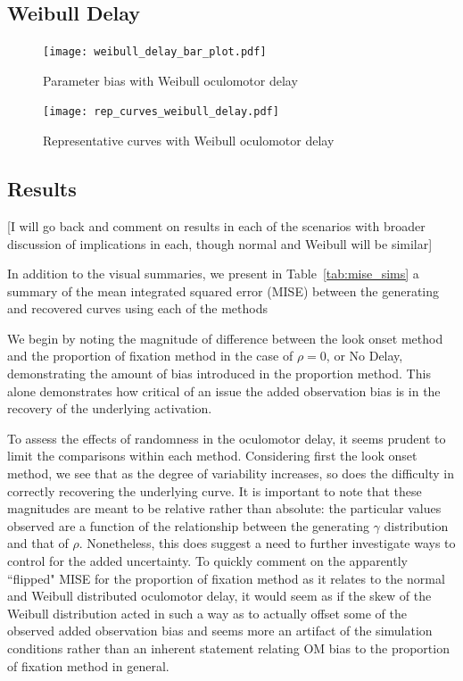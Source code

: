 \subsection{Weibull Delay}



\begin{figure}[H]
\centering
\texttt{[image: weibull\_delay\_bar\_plot.pdf]}
\caption{Parameter bias with Weibull oculomotor delay}
\label{fig:par_bias_weibull_delay}
\end{figure}

\begin{figure}[H]
\centering
\texttt{[image: rep\_curves\_weibull\_delay.pdf]}
\caption{Representative curves with Weibull oculomotor delay}
\label{fig:rep_curves_weibull_delay}
\end{figure}





\subsection{Results}

[I will go back and comment on results in each of the scenarios with broader discussion of implications in each, though normal and Weibull will be similar]

In addition to the visual summaries, we present in Table~\ref{tab:mise_sims} a summary of the mean integrated squared error (MISE) between the generating and recovered curves using each of the methods

We begin by noting the  magnitude of difference between the look onset method and the proportion of fixation method in the case of $\rho = 0$, or No Delay, demonstrating the amount of bias introduced in the proportion method. This alone demonstrates how critical of an issue the added observation bias is in the recovery of the underlying activation.

To assess the effects of randomness in the oculomotor delay, it seems prudent to limit the comparisons within each method. Considering first the look onset method, we see that as the degree of variability increases, so does the difficulty in correctly recovering the underlying curve. It is important to note that these magnitudes are meant to be relative rather than absolute: the particular values observed are a function of the relationship between the generating $\gamma$ distribution and that of $\rho$. Nonetheless, this does suggest a need to further investigate ways to control for the added uncertainty. To quickly comment on the apparently ``flipped" MISE for the proportion of fixation method as it relates to the normal and Weibull distributed oculomotor delay, it would seem as if the skew of the Weibull distribution acted in such a way as to actually offset some of the observed added observation bias and seems more an artifact of the simulation conditions rather than an inherent statement relating OM bias to the proportion of fixation method in general.

